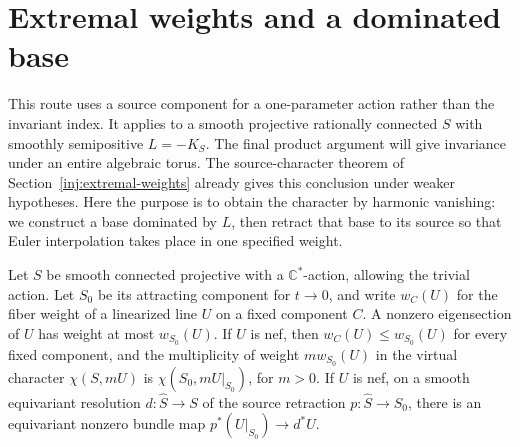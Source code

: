 \section{Extremal weights and a dominated base}\label{har:sec:extremal}

This route uses a source component for a one-parameter action rather
than the invariant index. It applies to a smooth projective rationally
connected \(S\) with smoothly semipositive \(L=-K_S\). The final
product argument will give invariance under an entire algebraic torus.
The source-character theorem of Section~\ref{inj:extremal-weights}
already gives this conclusion under weaker hypotheses. Here the
purpose is to obtain the character by harmonic vanishing: we construct
a base dominated by \(L\), then retract that base to its source so
that Euler interpolation takes place in one specified weight.

\begin{lemma}\label{har:lem:source}
Let \(S\) be smooth connected projective with a \(\mathbb C^*\)-action,
allowing the trivial action. Let \(S_0\) be its attracting component
for \(t\to0\), and write \(w_C(U)\) for the fiber weight of a
linearized line \(U\) on a fixed component \(C\).
A nonzero eigensection of \(U\) has weight at most \(w_{S_0}(U)\).
If \(U\) is nef, then \(w_C(U)\le w_{S_0}(U)\) for every fixed
component, and the multiplicity of weight \(mw_{S_0}(U)\) in the
virtual character \(\chi(S,mU)\) is
\(\chi(S_0,mU|_{S_0})\), for \(m>0\).
If \(U\) is nef, on a smooth equivariant resolution \(d:\widehat S\to S\) of the
source retraction \(p:\widehat S\to S_0\), there is an equivariant
nonzero bundle map \(p^*(U|_{S_0})\to d^*U\).
\end{lemma}

